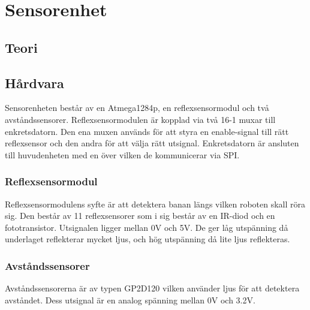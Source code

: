 
\section{Sensorenhet}

\subsection{Teori}

\subsection{Hårdvara}


Sensorenheten består av en Atmega1284p, en reflexsensormodul och två avståndssensorer. Reflexsensormodulen är kopplad via två 16-1 muxar till enkretsdatorn. Den ena muxen används för att styra en enable-signal till rätt reflexsensor och den andra för att välja rätt utsignal. Enkretsdatorn är ansluten till huvudenheten med en  över vilken de kommunicerar via SPI.

\begin{figure}[h]
\scalebox{0.8}{}

\caption{}
\end{figure}

\subsubsection{Reflexsensormodul}

Reflexsensormodulens syfte är att detektera banan längs vilken roboten skall röra sig. Den består av 11 reflexsensorer som i sig består av en IR-diod och en fototransistor. Utsignalen ligger mellan 0V och 5V. De ger låg utspänning då underlaget reflekterar mycket ljus, och hög utspänning då lite ljus reflekteras.

\subsubsection{Avståndssensorer}

Avståndssensorerna är av typen GP2D120 vilken använder ljus för att detektera avståndet. Dess utsignal är en analog spänning mellan 0V och 3.2V.

